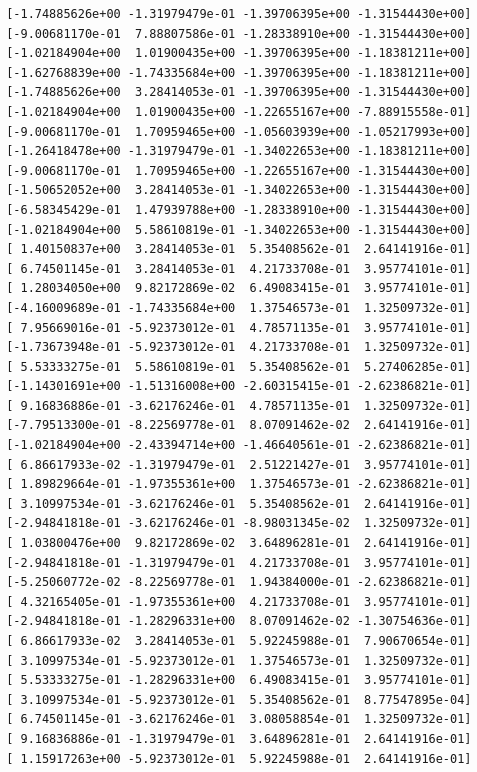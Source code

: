\documentclass[
]{article}
\begin{document}
\begin{lstlisting}
 [-1.74885626e+00 -1.31979479e-01 -1.39706395e+00 -1.31544430e+00]
 [-9.00681170e-01  7.88807586e-01 -1.28338910e+00 -1.31544430e+00]
 [-1.02184904e+00  1.01900435e+00 -1.39706395e+00 -1.18381211e+00]
 [-1.62768839e+00 -1.74335684e+00 -1.39706395e+00 -1.18381211e+00]
 [-1.74885626e+00  3.28414053e-01 -1.39706395e+00 -1.31544430e+00]
 [-1.02184904e+00  1.01900435e+00 -1.22655167e+00 -7.88915558e-01]
 [-9.00681170e-01  1.70959465e+00 -1.05603939e+00 -1.05217993e+00]
 [-1.26418478e+00 -1.31979479e-01 -1.34022653e+00 -1.18381211e+00]
 [-9.00681170e-01  1.70959465e+00 -1.22655167e+00 -1.31544430e+00]
 [-1.50652052e+00  3.28414053e-01 -1.34022653e+00 -1.31544430e+00]
 [-6.58345429e-01  1.47939788e+00 -1.28338910e+00 -1.31544430e+00]
 [-1.02184904e+00  5.58610819e-01 -1.34022653e+00 -1.31544430e+00]
 [ 1.40150837e+00  3.28414053e-01  5.35408562e-01  2.64141916e-01]
 [ 6.74501145e-01  3.28414053e-01  4.21733708e-01  3.95774101e-01]
 [ 1.28034050e+00  9.82172869e-02  6.49083415e-01  3.95774101e-01]
 [-4.16009689e-01 -1.74335684e+00  1.37546573e-01  1.32509732e-01]
 [ 7.95669016e-01 -5.92373012e-01  4.78571135e-01  3.95774101e-01]
 [-1.73673948e-01 -5.92373012e-01  4.21733708e-01  1.32509732e-01]
 [ 5.53333275e-01  5.58610819e-01  5.35408562e-01  5.27406285e-01]
 [-1.14301691e+00 -1.51316008e+00 -2.60315415e-01 -2.62386821e-01]
 [ 9.16836886e-01 -3.62176246e-01  4.78571135e-01  1.32509732e-01]
 [-7.79513300e-01 -8.22569778e-01  8.07091462e-02  2.64141916e-01]
 [-1.02184904e+00 -2.43394714e+00 -1.46640561e-01 -2.62386821e-01]
 [ 6.86617933e-02 -1.31979479e-01  2.51221427e-01  3.95774101e-01]
 [ 1.89829664e-01 -1.97355361e+00  1.37546573e-01 -2.62386821e-01]
 [ 3.10997534e-01 -3.62176246e-01  5.35408562e-01  2.64141916e-01]
 [-2.94841818e-01 -3.62176246e-01 -8.98031345e-02  1.32509732e-01]
 [ 1.03800476e+00  9.82172869e-02  3.64896281e-01  2.64141916e-01]
 [-2.94841818e-01 -1.31979479e-01  4.21733708e-01  3.95774101e-01]
 [-5.25060772e-02 -8.22569778e-01  1.94384000e-01 -2.62386821e-01]
 [ 4.32165405e-01 -1.97355361e+00  4.21733708e-01  3.95774101e-01]
 [-2.94841818e-01 -1.28296331e+00  8.07091462e-02 -1.30754636e-01]
 [ 6.86617933e-02  3.28414053e-01  5.92245988e-01  7.90670654e-01]
 [ 3.10997534e-01 -5.92373012e-01  1.37546573e-01  1.32509732e-01]
 [ 5.53333275e-01 -1.28296331e+00  6.49083415e-01  3.95774101e-01]
 [ 3.10997534e-01 -5.92373012e-01  5.35408562e-01  8.77547895e-04]
 [ 6.74501145e-01 -3.62176246e-01  3.08058854e-01  1.32509732e-01]
 [ 9.16836886e-01 -1.31979479e-01  3.64896281e-01  2.64141916e-01]
 [ 1.15917263e+00 -5.92373012e-01  5.92245988e-01  2.64141916e-01]

\end{lstlisting}
\end{document}
